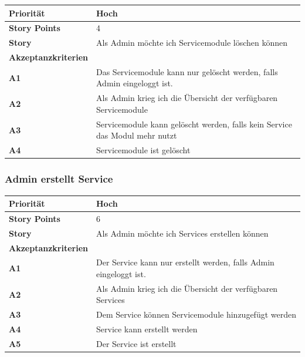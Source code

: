 \documentclass[11pt]{scrartcl}
\begin{document}
 \begin{tabularx}{\linewidth}{l X}
  \textbf{Priorität} & Hoch\\
  \hline
  \textbf{Story Points} & 4\\
  \hline
  \textbf{Story}& Als Admin möchte ich Servicemodule löschen können\\
  \hline
    \textbf{Akzeptanzkriterien} & \\
    \hline
      \textbf{A1} & Das Servicemodule kann nur gelöscht werden, falls Admin eingeloggt ist.\\
  \hline
  \textbf{A2} & Als Admin krieg ich die Übersicht der verfügbaren Servicemodule\\
  \hline
  \textbf{A3} & Servicemodule kann gelöscht werden, falls kein Service das Modul mehr nutzt\\
  \hline
    \textbf{A4} & Servicemodule ist gelöscht\\
  \hline
 \end{tabularx}
 
 
 \subsubsection{Admin erstellt Service}
 \begin{tabularx}{\linewidth}{l X}
  \textbf{Priorität} & Hoch\\
  \hline
  \textbf{Story Points} & 6\\
  \hline
  \textbf{Story}& Als Admin möchte ich Services erstellen können\\
  \hline
    \textbf{Akzeptanzkriterien} & \\
    \hline
      \textbf{A1} & Der Service kann nur erstellt werden, falls Admin eingeloggt ist.\\
  \hline
  \textbf{A2} & Als Admin krieg ich die Übersicht der verfügbaren Services\\
  \hline
    \textbf{A3} & Dem Service können Servicemodule hinzugefügt werden\\
  \hline
  \textbf{A4} & Service kann erstellt werden\\
  \hline
    \textbf{A5} & Der Service ist erstellt\\
  \hline
 \end{tabularx}
 
\end{document}
